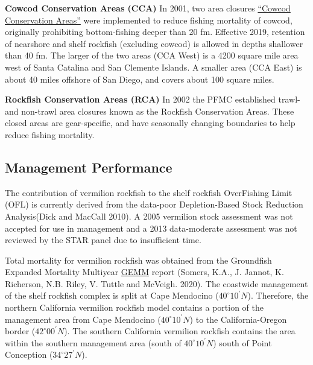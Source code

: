 \documentclass[11pt,
  english,
  a4paper,
]{article}
\begin{document}
\textbf{Cowcod Conservation Areas (CCA)} In 2001, two area closures {\href{https://nrm.dfg.ca.gov/FileHandler.ashx?DocumentID=36132\&inline}{``Cowcod Conservation Areas''}\leavevmode\tagmcend\tagstructend} were implemented to reduce fishing mortality of cowcod, originally prohibiting bottom-fishing deeper than 20 fm. Effective 2019, retention of nearshore and shelf rockfish (excluding cowcod) is allowed in depths shallower than 40 fm. The larger of the two areas (CCA West) is a 4200 square mile area west of Santa Catalina and San Clemente Islands. A smaller area (CCA East) is about 40 miles offshore of San Diego, and covers about 100 square miles.

\textbf{Rockfish Conservation Areas (RCA)} In 2002 the PFMC established trawl- and non-trawl area closures known as the Rockfish Conservation Areas. These closed areas are gear-specific, and have seasonally changing boundaries to help reduce fishing mortality.


\hypertarget{management-performance-1}{%
\subsection{Management Performance}\label{management-performance-1}}

\leavevmode\tagmcend\tagstructend

The contribution of vermilion rockfish to the shelf rockfish OverFishing Limit (OFL) is currently derived from the data-poor Depletion-Based Stock Reduction Analysis{(Dick and MacCall 2010)\leavevmode\tagmcend\tagstructend}. A 2005 vermilion stock assessment was not accepted for use in management and a 2013 data-moderate assessment was not reviewed by the STAR panel due to insufficient time.

Total mortality for vermilion rockfish was obtained from the Groundfish Expanded Mortality Multiyear {\href{https://www.nwfsc.noaa.gov/data/api/v1/source/observer.gemm_fact/selection.xlsx}{GEMM}\leavevmode\tagmcend\tagstructend} report {(Somers, K.A., J. Jannot, K. Richerson, N.B. Riley, V. Tuttle and McVeigh. 2020)\leavevmode\tagmcend\tagstructend}. The coastwide management of the shelf rockfish complex is split at Cape Mendocino ($40^\circ 10^\prime N$). Therefore, the northern California vermilion rockfish model contains a portion of the management area from Cape Mendocino ($40^\circ 10^\prime N$) to the California-Oregon border ($42^\circ 00^\prime N$). The southern California vermilion rockfish contains the area within the southern management area (south of $40^\circ 10^\prime N$) south of Point Conception ($34^\circ 27^\prime N$).
\end{document}
